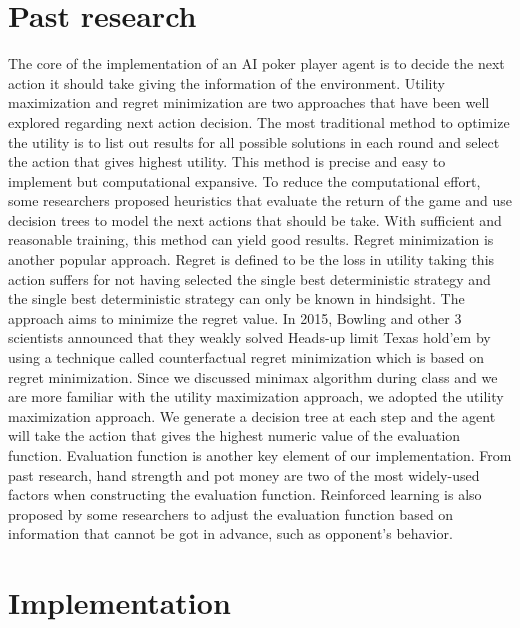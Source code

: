 \documentclass{article}
\begin{document}
\section{Past research}
The core of the implementation of an AI poker player agent is to decide the next action it should take giving the information of the environment. Utility maximization and regret minimization are two approaches that have been well explored regarding next action decision. The most traditional method to optimize the utility is to list out results for all possible solutions in each round and select the action that gives highest utility. This method is precise and easy to implement but computational expansive. To reduce the computational effort, some researchers proposed heuristics that evaluate the return of the game and use decision trees to model the next actions that should be take. With sufficient and reasonable training, this method can yield good results. Regret minimization is another popular approach. Regret is defined to be the loss in utility taking this action suffers for not having selected the single best deterministic strategy and the single best deterministic strategy can only be known in hindsight. The approach aims to minimize the regret value. In 2015, Bowling and other 3 scientists announced that they weakly solved Heads-up limit Texas hold’em by using a technique called counterfactual regret minimization which is based on regret minimization. 
Since we discussed minimax algorithm during class and we are more familiar with the utility maximization approach, we adopted the utility maximization approach. We generate a decision tree at each step and the agent will take the action that gives the highest numeric value of the evaluation function. Evaluation function is another key element of our implementation. From past research, hand strength and pot money are two of the most widely-used factors when constructing the evaluation function. Reinforced learning is also proposed by some researchers to adjust the evaluation function based on information that cannot be got in advance, such as opponent’s behavior.  

\section{Implementation}
\end{document}
